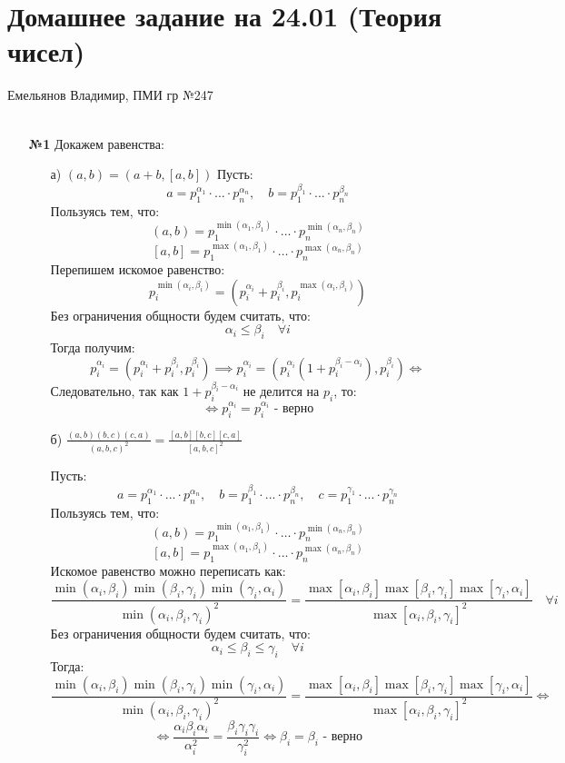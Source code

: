 \documentclass[a4paper]{article}
\renewcommand{\f}[2]{\frac{#1}{#2}}
\newcommand{\lr}{\Leftrightarrow}
\renewcommand{\leq}{\leqslant}
\begin{document}
\section*{Домашнее задание на 24.01 (Теория чисел)}
 {\large Емельянов Владимир, ПМИ гр №247}\\\\
\begin{enumerate}
    \item[\textbf{№1}]Докажем равенства:
    \begin{enumerate}
        \item[а)]$(a, b) = (a+b, [a,b])$
        Пусть:
        $$a = p_1^{\alpha_1}\cdot...\cdot p_n^{\alpha_n}, \quad b = p_1^{\beta_1}\cdot ... \cdot p_n^{\beta_n}$$
        Пользуясь тем, что:
        $$(a, b) = p_1^{\min(\alpha_1, \beta_1)}\cdot \dots \cdot p_n^{\min(\alpha_n, \beta_n)}$$
        $$[a, b] = p_1^{\max(\alpha_1, \beta_1)}\cdot \dots \cdot p_n^{\max(\alpha_n, \beta_n)}$$
        Перепишем искомое равенство:
        $$p_i^{\min(\alpha_i, \beta_i)} = (p_i^{\alpha_i}+p_i^{\beta_i}, p_i^{\max(\alpha_i, \beta_i)})$$
        Без ограничения общности будем считать, что:
        $$\alpha_i \leq \beta_i \quad \forall i$$
        Тогда получим:
        $$p_i^{\alpha_i} = (p_i^{\alpha_i}+p_i^{\beta_i}, p_i^{\beta_i}) \implies p_i^{\alpha_i} = (p_i^{\alpha_i}(1+p_i^{\beta_i-\alpha_i}), p_i^{\beta_i}) \lr$$
        Следовательно, так как $1+p_i^{\beta_i-\alpha_i}$ не делится на $p_i$, то:
        $$\lr p_i^{\alpha_i} = p_i^{\alpha_i} \text{ - верно}$$

        \item[б)]$\f{(a,b)(b,c)(c,a)}{(a,b,c)^2} = \f{[a, b][b, c][c, a]}{[a, b, c]^2}$
        
        Пусть:
        $$a = p_1^{\alpha_1}\cdot...\cdot p_n^{\alpha_n}, \quad b = p_1^{\beta_1}\cdot ... \cdot p_n^{\beta_n}, \quad c = p_1^{\gamma_1}\cdot ... \cdot p_n^{\gamma_n}$$
        Пользуясь тем, что:
        $$(a, b) = p_1^{\min(\alpha_1, \beta_1)}\cdot \dots \cdot p_n^{\min(\alpha_n, \beta_n)}$$
        $$[a, b] = p_1^{\max(\alpha_1, \beta_1)}\cdot \dots \cdot p_n^{\max(\alpha_n, \beta_n)}$$
        Искомое равенство можно переписать как:
        $$\f{\min(\alpha_i,\beta_i)\min(\beta_i,\gamma_i)\min(\gamma_i,\alpha_i)}{\min(\alpha_i,\beta_i,\gamma_i)^2} = \f{\max[\alpha_i, \beta_i]\max[\beta_i, \gamma_i]\max[\gamma_i, \alpha_i]}{\max[\alpha_i, \beta_i, \gamma_i]^2} \quad \forall i$$
        Без ограничения общности будем считать, что:
        $$\alpha_i \leq \beta_i \leq \gamma_i \quad \forall i$$
        Тогда:
        $$\f{\min(\alpha_i,\beta_i)\min(\beta_i,\gamma_i)\min(\gamma_i,\alpha_i)}{\min(\alpha_i,\beta_i,\gamma_i)^2} = \f{\max[\alpha_i, \beta_i]\max[\beta_i, \gamma_i]\max[\gamma_i, \alpha_i]}{\max[\alpha_i, \beta_i, \gamma_i]^2} \lr $$
        $$\lr \f{\alpha_i\beta_i\alpha_i}{\alpha_i^2} = \f{\beta_i\gamma_i\gamma_i}{\gamma_i^2} \lr \beta_i = \beta_i \text{ - верно}$$
    \end{enumerate}
    

\end{enumerate}
\end{document}
